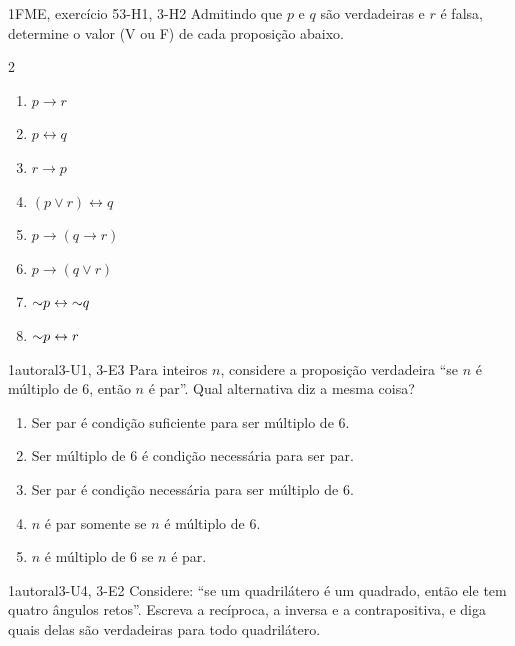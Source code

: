 \begin{questao}{1}{FME, exercício 5}{3-H1, 3-H2}\label{u3:q2}
Admitindo que $p$ e $q$ são verdadeiras e $r$ é falsa, determine o valor (V ou F) de cada proposição abaixo.
\begin{multicols}{2}
\begin{enumerate}[label=\alph*)]
  \item $p\rightarrow r$
  \item $p\leftrightarrow q$
  \item $r\rightarrow p$
  \item $(p\vee r)\leftrightarrow q$
  \item $p\rightarrow(q\rightarrow r)$
  \item $p\rightarrow(q\vee r)$
  \item ${{\sim}}p\leftrightarrow{{\sim}}q$
  \item ${{\sim}}p\leftrightarrow r$
\end{enumerate}
\end{multicols}
\end{questao}

\begin{questao}{1}{autoral}{3-U1, 3-E3}\label{u3:q3}
Para inteiros $n$, considere a proposição verdadeira \enquote{se $n$ é múltiplo de 6, então $n$ é par}. Qual alternativa diz a mesma coisa?
\begin{enumerate}[label=(\alph*)]
  \item Ser par é condição suficiente para ser múltiplo de 6.
  \item Ser múltiplo de 6 é condição necessária para ser par.
  \item Ser par é condição necessária para ser múltiplo de 6.
  \item $n$ é par somente se $n$ é múltiplo de 6.
  \item $n$ é múltiplo de 6 se $n$ é par.
\end{enumerate}
\end{questao}

\begin{questao}{1}{autoral}{3-U4, 3-E2}\label{u3:q4}
Considere: \enquote{se um quadrilátero é um quadrado, então ele tem quatro ângulos retos}. Escreva a recíproca, a inversa e a contrapositiva, e diga quais delas são verdadeiras para todo quadrilátero.
\end{questao}

